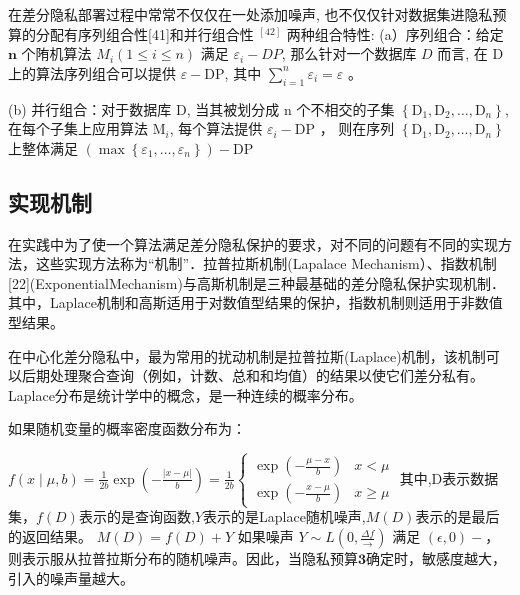 \begin{define}[组合定理]\label{组合定理}
在差分隐私部署过程中常常不仅仅在一处添加噪声, 也不仅仅针对数据集进隐私预算的分配有序列组合性[41]和并行组合性 ${ }^{[42]}$ 两种组合特性:
(a）序列组合：给定 $\mathbf{n}$ 个陏机算法 $M_{i}(1 \leq i \leq n)$ 满足 $\varepsilon_{i}-DP$, 那么针对一个数据库 $D$ 而言, 在 $\mathrm{D}$ 上的算法序列组合可以提供 $\varepsilon-\mathrm{DP}$, 其中 $\sum_{i=1}^{n} \varepsilon_{i}=\varepsilon$ 。

(b) 并行组合：对于数据库 $\mathrm{D}$, 当其被划分成 $\mathrm{n}$ 个不相交的子集 $\left\{\mathrm{D}_{1}, \mathrm{D}_{2}, \ldots, \mathrm{D}_{n}\right\}$, 在每个子集上应用算法 $\mathrm{M}_{i}$, 每个算法提供 $\varepsilon_{i}-\mathrm{DP}$ ， 则在序列 $\left\{\mathrm{D}_{1}, \mathrm{D}_{2}, \ldots, \mathrm{D}_{n}\right\}$ 上整体满足 $\left(\max \left\{\varepsilon_{1}, \ldots, \varepsilon_{n}\right\}\right)-\mathrm{DP}$
\end{define}


\subsection{实现机制}
在实践中为了使一个算法满足差分隐私保护的要求，对不同的问题有不同的实现方法，这些实现方法称为“机制”．拉普拉斯机制(Lapalace Mechanism）、指数机制[22](ExponentialMechanism)与高斯机制是三种最基础的差分隐私保护实现机制．其中，Laplace机制和高斯适用于对数值型结果的保护，指数机制则适用于非数值型结果。

在中心化差分隐私中，最为常用的扰动机制是拉普拉斯(Laplace)机制，该机制可以后期处理聚合查询（例如，计数、总和和均值）的结果以使它们差分私有。
Laplace分布是统计学中的概念，是一种连续的概率分布。
\begin{define}[拉普拉斯机制]\label{拉普拉斯机制}
如果随机变量的概率密度函数分布为：

$f(x \mid \mu, b)=\frac{1}{2 b} \exp \left(-\frac{|x-\mu|}{b}\right)=\frac{1}{2 b}\left\{\begin{array}{ll}\exp \left(-\frac{\mu-x}{b}\right) & x<\mu \\ \exp \left(-\frac{x-\mu}{b}\right) & x \geq \mu\end{array}\right.$
其中,D表示数据集，$f(D)$表示的是查询函数,$Y$表示的是Laplace随机噪声,$M(D)$表示的是最后的返回结果。
$M(D)=f(D)+Y$
如果噪声 $Y \sim L\left(0, \frac{\Delta f}{\longrightarrow}\right)$ 满足 $(\epsilon, 0)-$，则表示服从拉普拉斯分布的随机噪声。因此，当隐私预算$\mathbf{3}$确定时，敏感度越大，引入的噪声量越大。
\end{define}


